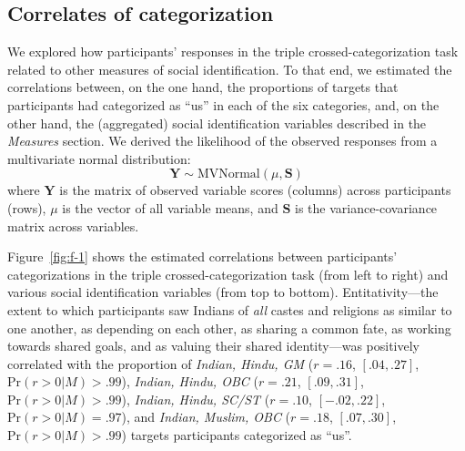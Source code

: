 \documentclass[12pt, a4paper]{article}
\begin{document}
\subsection{Correlates of categorization}

We explored how participants' responses in the triple crossed-categorization task related to other measures of social identification. To that end, we estimated the correlations between, on the one hand, the proportions of targets that participants had categorized as ``us'' in each of the six categories, and, on the other hand, the (aggregated) social identification variables described in the \emph{Measures} section. We derived the likelihood of the observed responses from a multivariate normal distribution: $$ \textbf{Y} \sim \text{MVNormal} (\mu , \textbf{S} ) $$ where $\textbf{Y}$ is the matrix of observed variable scores (columns) across participants (rows), $\mu$ is the vector of all variable means, and $\textbf{S}$ is the variance-covariance matrix across variables.

Figure~\ref{fig:f-1} shows the estimated correlations between participants' categorizations in the triple crossed-categorization task (from left to right) and various social identification variables (from top to bottom). Entitativity---the extent to which participants saw Indians of \emph{all} castes and religions as similar to one another, as depending on each other, as sharing a common fate, as working towards shared goals, and as valuing their shared identity---was positively correlated with the proportion of \emph{Indian, Hindu, GM} ($r = .16$, $[.04, .27]$, $\text{Pr} (r > 0|M) > .99$), \emph{Indian, Hindu, OBC} ($r = .21$, $[.09, .31]$, $\text{Pr} (r > 0| M) > .99$), \emph{Indian, Hindu, SC/ST} ($r = .10$, $[-.02, .22]$, $\text{Pr} (r > 0| M) = .97$), and \emph{Indian, Muslim, OBC} ($r = .18$, $[.07, .30]$, $\text{Pr} (r > 0| M) > .99$) targets participants categorized as ``us''.
\end{document}
